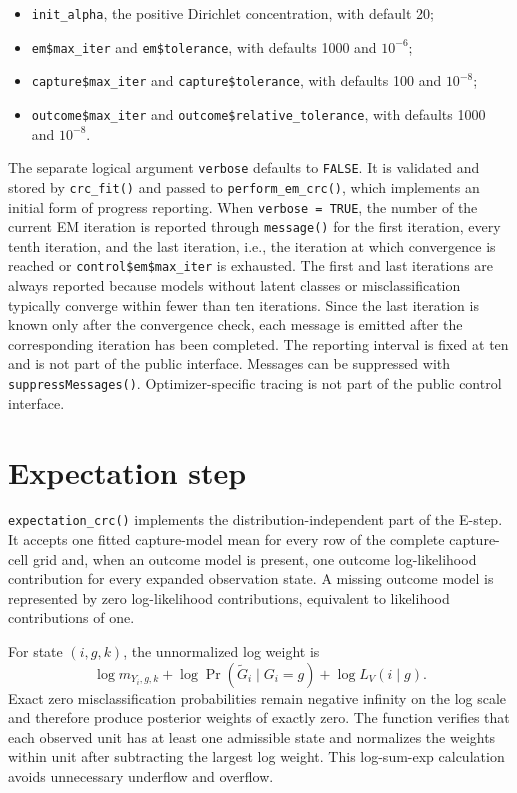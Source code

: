 \documentclass[11pt,letterpaper]{article}
\begin{document}
\begin{itemize}
  \item \texttt{init\_alpha}, the positive Dirichlet concentration, with
  default 20;
  \item \texttt{em\$max\_iter} and \texttt{em\$tolerance}, with defaults
  1000 and $10^{-6}$;
  \item \texttt{capture\$max\_iter} and
  \texttt{capture\$tolerance}, with defaults 100 and $10^{-8}$;
  \item \texttt{outcome\$max\_iter} and
  \texttt{outcome\$relative\_tolerance}, with defaults 1000 and $10^{-8}$.
\end{itemize}

The separate logical argument \texttt{verbose} defaults to \texttt{FALSE}.
It is validated and stored by \texttt{crc\_fit()} and passed to
\texttt{perform\_em\_crc()}, which implements an initial form of progress
reporting. When \texttt{verbose = TRUE}, the number of the current EM
iteration is reported through \texttt{message()} for the first iteration,
every tenth iteration, and the last iteration, i.e., the iteration at which
convergence is reached or \texttt{control\$em\$max\_iter} is exhausted. The
first and last iterations are always reported because models without latent
classes or misclassification typically converge within fewer than ten
iterations. Since the last iteration is known only after the convergence
check, each message is emitted after the corresponding iteration has been
completed. The reporting interval is fixed at ten and is not part of the
public interface. Messages can be suppressed with
\texttt{suppressMessages()}. Optimizer-specific tracing is not part of the
public control interface.

\section{Expectation step}

\texttt{expectation\_crc()} implements the distribution-independent part of
the E-step. It accepts one fitted capture-model mean for every row of the
complete capture-cell grid and, when an outcome model is present, one outcome
log-likelihood contribution for every expanded observation state. A missing
outcome model is represented by zero log-likelihood contributions, equivalent
to likelihood contributions of one.

For state $(i,g,k)$, the unnormalized log weight is
\[
  \log m_{Y_i,g,k}
  + \log \Pr(\widetilde G_i\mid G_i=g)
  + \log L_V(i\mid g).
\]
Exact zero misclassification probabilities remain negative infinity on the
log scale and therefore produce posterior weights of exactly zero. The
function verifies that each observed unit has at least one admissible state
and normalizes the weights within unit after subtracting the largest log
weight. This log-sum-exp calculation avoids unnecessary underflow and
overflow.
\end{document}
